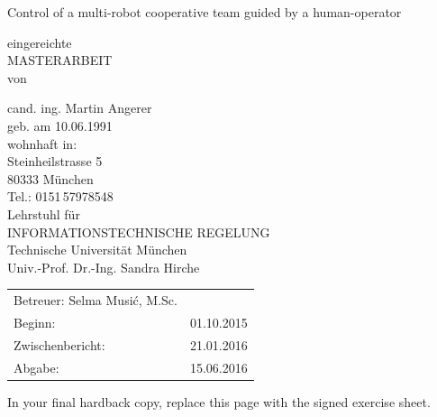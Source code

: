 \documentclass[a4paper,twoside, openright,12pt]{report}
\begin{document}
\pagestyle{empty}
\enlargethispage{4.5cm} %
\begin{center}
\phantom{u}
\vspace{0.5cm}
\Huge{\sc Control of a multi-robot cooperative team guided by a human-operator}\\
\vspace{1.5cm}
                                 \large{eingereichte\\
                                 \large{	MASTERARBEIT\\ 
										   von\\}          

						\vspace{0.4cm}
					cand. ing. Martin Angerer\\
						\vspace{0.5cm}
					geb. am 10.06.1991\\
					wohnhaft in:\\
					Steinheilstrasse 5\\
					80333 M\"unchen\\
					Tel.: 0151\,57978548\\
					\vspace{1.5cm}
					Lehrstuhl f\"ur\\
					INFORMATIONSTECHNISCHE REGELUNG \\
					Technische Universit\"at M\"unchen\\
					\vspace{0.6cm}
                    Univ.-Prof. Dr.-Ing. Sandra Hirche}
\end{center}
\vspace{5.0cm}
\begin{tabular}{ll}
Betreuer: Selma Musi\'c, M.Sc.  \\
Beginn: & 01.10.2015  \\
Zwischenbericht: &  21.01.2016  \\
Abgabe: &  15.06.2016 \\
\end{tabular}

\newpage
\cleardoublepage



\phantom{u}
\phantom{1}\vspace{6cm}
\begin{center}
In your final hardback copy, replace this page with the signed exercise sheet.
\end{center}
\end{document}
